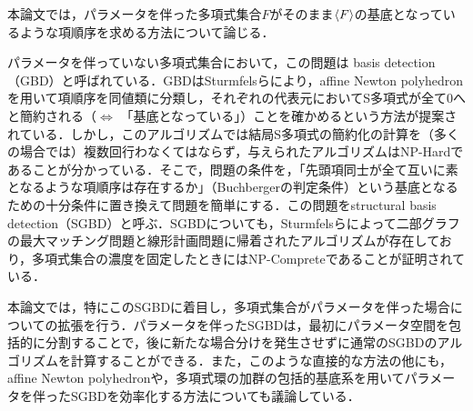本論文では，パラメータを伴った多項式集合$F$がそのまま$\langle F \rangle$の\groebner{}基底となっているような項順序を求める方法について論じる．
\par
パラメータを伴っていない多項式集合において，この問題は\groebner{} basis detection（GBD）と呼ばれている．GBDはSturmfelsらにより，affine Newton polyhedronを用いて項順序を同値類に分類し，それぞれの代表元においてS多項式が全て$0$へと簡約される（$\Leftrightarrow$ 「\groebner{}基底となっている」）ことを確かめるという方法が提案されている\cite{gritzmann1993minkowski}．しかし，このアルゴリズムでは結局S多項式の簡約化の計算を（多くの場合では）複数回行わなくてはならず，与えられたアルゴリズムはNP-Hardであることが分かっている\cite[Corollary11]{sturmfels1997structural}．そこで，問題の条件を，「先頭項同士が全て互いに素となるような項順序は存在するか」（Buchbergerの判定条件）という\groebner{}基底となるための十分条件に置き換えて問題を簡単にする．この問題をstructural \groebner{} basis detection（SGBD）と呼ぶ．SGBDについても，Sturmfelsらによって二部グラフの最大マッチング問題と線形計画問題に帰着されたアルゴリズムが存在しており，多項式集合の濃度を固定したときにはNP-Compreteであることが証明されている\cite[Corollary3]{sturmfels1997structural}．
\par
本論文では，特にこのSGBDに着目し，多項式集合がパラメータを伴った場合についての拡張を行う．パラメータを伴ったSGBDは，最初にパラメータ空間を包括的に分割することで，後に新たな場合分けを発生させずに通常のSGBDのアルゴリズムを計算することができる．また，このような直接的な方法の他にも，affine Newton polyhedronや，多項式環の加群の包括的\groebner{}基底系を用いてパラメータを伴ったSGBDを効率化する方法についても議論している．








